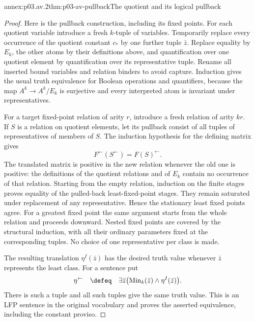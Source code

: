 \begin{annexitem}{annex:p03.av.2}{thm:p03-av-pullback}{The quotient and its logical pullback}
\begin{proof}
Here is the pullback construction, including its fixed points. For
each quotient variable introduce a fresh \(k\)-tuple of variables.
Temporarily replace every occurrence of the quotient constant
\(c_\ast\) by one further tuple \(\bar z\). Replace equality
by \(E_k\), the other atoms by their definitions above, and
quantification over one quotient element by quantification over its
representative tuple. Rename all inserted bound variables and relation
binders to avoid capture. Induction gives the usual truth equivalence
for Boolean operations and quantifiers, because the map
\(A^k\to A^k/E_k\) is surjective and every interpreted atom
is invariant under representatives.

For a target fixed-point relation of arity \(r\), introduce a
fresh relation of arity \(kr\). If \(S\) is a relation on
quotient elements, let its pullback consist of all tuples of
representatives of members of \(S\). The induction hypothesis
for the defining matrix gives
\[
 F^{\leftarrow}(S^{\leftarrow})
             =F(S)^{\leftarrow}.
\]
The translated matrix is positive in the new relation whenever the
old one is positive: the definitions of the quotient relations and
of \(E_k\) contain no occurrence of that relation. Starting from
the empty relation, induction on the finite stages proves equality
of the pulled-back least-fixed-point stages. They remain saturated
under replacement of any representative. Hence the stationary least
fixed points agree. For a greatest fixed point the same argument starts
from the whole relation and proceeds downward. Nested fixed points
are covered by the structural induction, with all their ordinary
parameters fixed at the corresponding tuples. No choice of one
representative per class is made.

The resulting translation \(\eta^I(\bar z)\) has the desired
truth value whenever \(\bar z\) represents the least class.
For a sentence put
\[
 \eta^{\leftarrow}\quad\defeq\quad
 \exists\bar z\bigl(\operatorname{Min}_k(\bar z)
                              \land\eta^I(\bar z)\bigr).
\]
There is such a tuple and all such tuples give the same truth value.
This is an LFP sentence in the original vocabulary and proves the
asserted equivalence, including the constant proviso.
\end{proof}
\end{annexitem}

